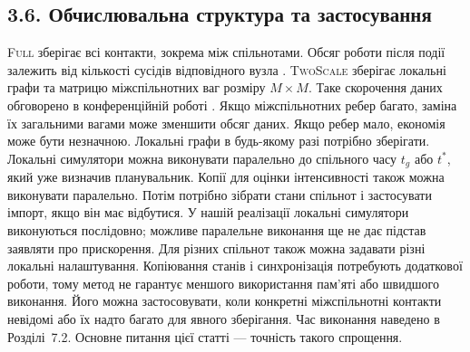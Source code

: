 ﻿\documentclass[11pt,a4paper]{article}
\newcommand{\Full}{\textup{\textsc{Full}}}
\newcommand{\TS}{\textup{\textsc{TwoScale}}}
\begin{document}
\subsection*{3.6. Обчислювальна структура та застосування}
\Full{} зберігає всі контакти, зокрема між спільнотами. Обсяг роботи після події залежить від кількості сусідів відповідного вузла \citep{kuryliak2025simulating}. \TS{} зберігає локальні графи та матрицю міжспільнотних ваг розміру $M\times M$. Таке скорочення даних обговорено в конференційній роботі \citep{kuryliak2025towards}. Якщо міжспільнотних ребер багато, заміна їх загальними вагами може зменшити обсяг даних. Якщо ребер мало, економія може бути незначною. Локальні графи в будь-якому разі потрібно зберігати.
Локальні симулятори можна виконувати паралельно до спільного часу $t_g$ або $t^\ast$, який уже визначив планувальник. Копії для оцінки інтенсивності також можна виконувати паралельно. Потім потрібно зібрати стани спільнот і застосувати імпорт, якщо він має відбутися. У нашій реалізації локальні симулятори виконуються послідовно; можливе паралельне виконання ще не дає підстав заявляти про прискорення. Для різних спільнот також можна задавати різні локальні налаштування.
Копіювання станів і синхронізація потребують додаткової роботи, тому метод не гарантує меншого використання пам'яті або швидшого виконання. Його можна застосовувати, коли конкретні міжспільнотні контакти невідомі або їх надто багато для явного зберігання. Час виконання наведено в Розділі~7.2. Основне питання цієї статті --- точність такого спрощення.
\clearpage
\end{document}
